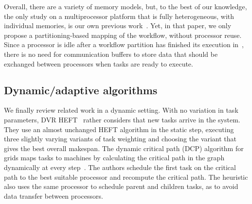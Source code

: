 \documentclass[conference]{IEEEtran}
\newcommand{\new}[1]{{#1}}
\begin{document}
Overall, there are a variety of memory models, but, to the best of our knowledge, the only study on a multiprocessor
platform that is fully heterogeneous, with individual memories, \new{is our own previous work~\cite{DBLP:conf/icpp/KulaginaMB24}.}
\new{Yet, in that paper, we only propose} a partitioning-based mapping of the workflow, without processor reuse.
\new{Since a processor is idle after a workflow partition has finished its execution 
in~\cite{DBLP:conf/icpp/KulaginaMB24},
there is no need for communication buffers to store data
that should be \new{exchanged} between processors when tasks are ready to execute.}


 \subsection{%
Dynamic/adaptive algorithms}
We finally review related work in a dynamic setting. With no variation in task parameters, 
    DVR HEFT~\cite{SANDOKJI2019482} rather considers that new tasks arrive in the system. 
    They use an almost unchanged HEFT algorithm in the static step, executing three slightly
    varying variants of task weighting and choosing the variant that gives the best overall makespan.
%
    The dynamic critical path (DCP) algorithm for grids maps tasks to machines
    by calculating the critical path in the graph dynamically at every step~\cite{rahman2013}.
    The authors schedule the first task on the critical path to the best suitable processor and recompute the critical path.
    The heuristic also uses the same processor to schedule parent and children tasks, as to avoid data transfer between processors.
\end{document}
